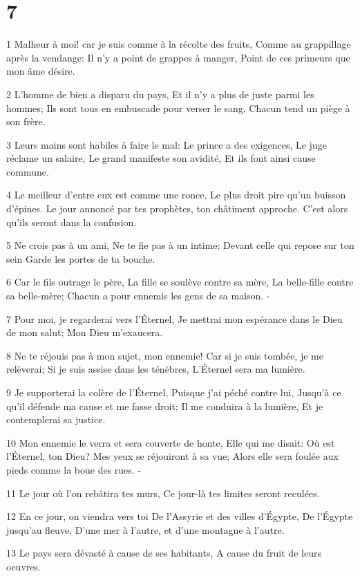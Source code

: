 \chapter{7}

\par 1 Malheur à moi! car je suis comme à la récolte des fruits, Comme au grappillage après la vendange: Il n'y a point de grappes à manger, Point de ces primeurs que mon âme désire.
\par 2 L'homme de bien a disparu du pays, Et il n'y a plus de juste parmi les hommes; Ils sont tous en embuscade pour verser le sang, Chacun tend un piège à son frère.
\par 3 Leurs mains sont habiles à faire le mal: Le prince a des exigences, Le juge réclame un salaire, Le grand manifeste son avidité, Et ils font ainsi cause commune.
\par 4 Le meilleur d'entre eux est comme une ronce, Le plus droit pire qu'un buisson d'épines. Le jour annoncé par tes prophètes, ton châtiment approche. C'est alors qu'ils seront dans la confusion.
\par 5 Ne crois pas à un ami, Ne te fie pas à un intime; Devant celle qui repose sur ton sein Garde les portes de ta bouche.
\par 6 Car le fils outrage le père, La fille se soulève contre sa mère, La belle-fille contre sa belle-mère; Chacun a pour ennemis les gens de sa maison. -
\par 7 Pour moi, je regarderai vers l'Éternel, Je mettrai mon espérance dans le Dieu de mon salut; Mon Dieu m'exaucera.
\par 8 Ne te réjouis pas à mon sujet, mon ennemie! Car si je suis tombée, je me relèverai; Si je suis assise dans les ténèbres, L'Éternel sera ma lumière.
\par 9 Je supporterai la colère de l'Éternel, Puisque j'ai péché contre lui, Jusqu'à ce qu'il défende ma cause et me fasse droit; Il me conduira à la lumière, Et je contemplerai sa justice.
\par 10 Mon ennemie le verra et sera couverte de honte, Elle qui me disait: Où est l'Éternel, ton Dieu? Mes yeux se réjouiront à sa vue; Alors elle sera foulée aux pieds comme la boue des rues. -
\par 11 Le jour où l'on rebâtira tes murs, Ce jour-là tes limites seront reculées.
\par 12 En ce jour, on viendra vers toi De l'Assyrie et des villes d'Égypte, De l'Égypte jusqu'au fleuve, D'une mer à l'autre, et d'une montagne à l'autre.
\par 13 Le pays sera dévasté à cause de ses habitants, A cause du fruit de leurs oeuvres.
